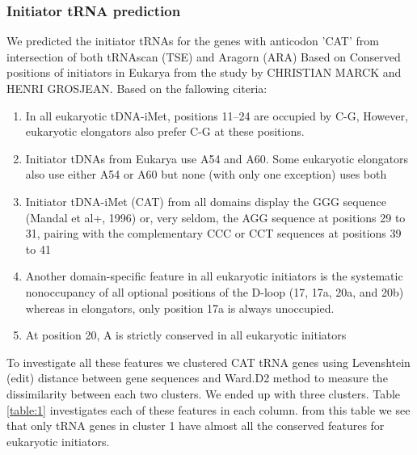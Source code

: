 \documentclass[
10pt, %
a4paper, %
oneside, %
headinclude,footinclude, %
BCOR5mm, %
]{scrartcl}
\begin{document}
\subsubsection*{Initiator tRNA prediction}
We predicted the initiator tRNAs for the genes with anticodon 'CAT' from intersection of both tRNAscan (TSE) and Aragorn (ARA) Based on Conserved positions of initiators in Eukarya from the study by CHRISTIAN MARCK and HENRI GROSJEAN. Based on the fallowing citeria:
\begin{enumerate}[noitemsep] %
\item In all eukaryotic tDNA-iMet, positions 11–24 are occupied by C-G, However, eukaryotic elongators
also prefer C-G at these positions.

\item Initiator tDNAs from Eukarya use A54 and A60. Some eukaryotic elongators also use either A54 or
A60 but none (with only one exception) uses both

\item Initiator tDNA-iMet (CAT) from all domains display the GGG sequence (Mandal et al+, 1996) or,
very seldom, the AGG sequence at positions 29 to 31, pairing with the complementary CCC or
CCT sequences at positions 39 to 41

\item Another domain-specific feature in all eukaryotic initiators is the systematic nonoccupancy of all
optional positions of the D-loop (17, 17a, 20a, and 20b) whereas in elongators, only position 17a is always unoccupied.

\item At position 20, A is strictly conserved in all eukaryotic initiators
\end{enumerate} 
To investigate all these features we clustered CAT tRNA genes using Levenshtein (edit) distance between gene sequences and Ward.D2 method to measure the dissimilarity between each two clusters. We ended up with three clusters. Table \ref{table:1} investigates each of these features in each column. from this table we see that only tRNA genes in cluster 1 have almost all the conserved features for eukaryotic initiators.
\end{document}
